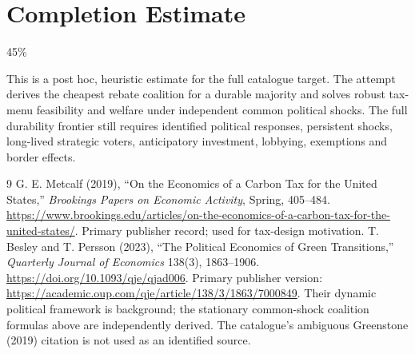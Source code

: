 \documentclass[11pt,a4paper]{article}
\theoremstyle{definition}
\theoremstyle{remark}
\begin{document}
\section{Completion Estimate}
45\%

This is a post hoc, heuristic estimate for the full catalogue target.
The attempt derives the cheapest rebate coalition for a durable majority and solves robust tax-menu feasibility and welfare under independent common political shocks. The full durability frontier still requires identified political responses, persistent shocks, long-lived strategic voters, anticipatory investment, lobbying, exemptions and border effects.

\begin{thebibliography}{9}
 G. E. Metcalf (2019), ``On the Economics of a Carbon Tax for the United States,'' \emph{Brookings Papers on Economic Activity}, Spring, 405--484. \url{https://www.brookings.edu/articles/on-the-economics-of-a-carbon-tax-for-the-united-states/}. Primary publisher record; used for tax-design motivation.
 T. Besley and T. Persson (2023), ``The Political Economics of Green Transitions,'' \emph{Quarterly Journal of Economics} 138(3), 1863--1906. \url{https://doi.org/10.1093/qje/qjad006}. Primary publisher version: \url{https://academic.oup.com/qje/article/138/3/1863/7000849}. Their dynamic political framework is background; the stationary common-shock coalition formulas above are independently derived. The catalogue's ambiguous Greenstone (2019) citation is not used as an identified source.
\end{thebibliography}
\end{document}
